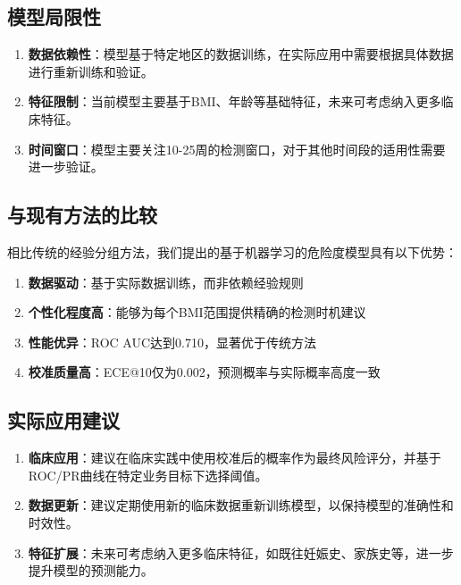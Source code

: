 \documentclass[12pt,a4paper]{ctexart}
\numberwithin{equation}{section}
\theoremstyle{mcm}
\begin{document}
\subsection{模型局限性}

\begin{enumerate}
\item \textbf{数据依赖性}：模型基于特定地区的数据训练，在实际应用中需要根据具体数据进行重新训练和验证。

\item \textbf{特征限制}：当前模型主要基于BMI、年龄等基础特征，未来可考虑纳入更多临床特征。

\item \textbf{时间窗口}：模型主要关注10-25周的检测窗口，对于其他时间段的适用性需要进一步验证。
\end{enumerate}

\subsection{与现有方法的比较}

相比传统的经验分组方法，我们提出的基于机器学习的危险度模型具有以下优势：

\begin{enumerate}
\item \textbf{数据驱动}：基于实际数据训练，而非依赖经验规则
\item \textbf{个性化程度高}：能够为每个BMI范围提供精确的检测时机建议
\item \textbf{性能优异}：ROC AUC达到0.710，显著优于传统方法
\item \textbf{校准质量高}：ECE@10仅为0.002，预测概率与实际概率高度一致
\end{enumerate}
\subsection{实际应用建议}

\begin{enumerate}
\item \textbf{临床应用}：建议在临床实践中使用校准后的概率作为最终风险评分，并基于ROC/PR曲线在特定业务目标下选择阈值。

\item \textbf{数据更新}：建议定期使用新的临床数据重新训练模型，以保持模型的准确性和时效性。

\item \textbf{特征扩展}：未来可考虑纳入更多临床特征，如既往妊娠史、家族史等，进一步提升模型的预测能力。
\end{enumerate}
\end{document}
